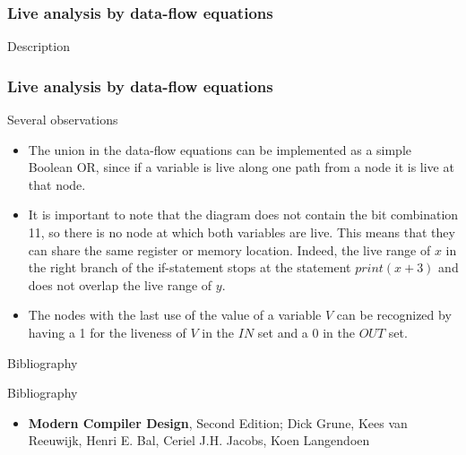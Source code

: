 \documentclass[presentation]{beamer}
\begin{document}
\begin{frame}
  \frametitle{Live analysis by data-flow equations}
  \begin{block}{Description}
  \end{block}
\end{frame}

\begin{frame}
  \frametitle{Live analysis by data-flow equations}
  \begin{block}{Several observations}
\begin{itemize}
    \item The union in the data-flow equations can be implemented as a simple Boolean OR, since if a variable is live along one path from a node it is live at that node.
    \item  It is important to note that the diagram does not contain the bit combination 11, so there is no node at which both variables are live. This means that they can share the same register or memory location. Indeed, the live range of $x$ in the right branch of the if-statement stops at the statement $print(x+3)$ and does not overlap the live range of $y$.
    \item  The nodes with the last use of the value of a variable $V$ can be recognized by having a 1 for the liveness of $V$ in the $IN$ set and a 0 in the $OUT$ set.
\end{itemize}
  \end{block}
\end{frame}

\begin{frame}{Bibliography}
\begin{block}{Bibliography}
\begin{itemize}
    \item \textbf{Modern Compiler Design}, Second Edition; Dick Grune, Kees van Reeuwijk, Henri E. Bal, Ceriel J.H. Jacobs, Koen Langendoen
\end{itemize}

\end{block}
\end{frame}
\end{document}
